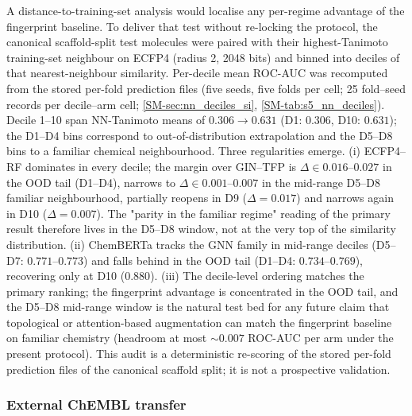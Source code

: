 \documentclass[11pt,a4paper]{article}
\begin{document}
A distance-to-training-set analysis would localise any per-regime advantage of the fingerprint baseline. To deliver that test without re-locking the protocol, the canonical scaffold-split test molecules were paired with their highest-Tanimoto training-set neighbour on ECFP4 (radius \num{2}, \num{2048} bits) and binned into deciles of that nearest-neighbour similarity. Per-decile mean ROC-AUC was recomputed from the stored per-fold prediction files (five seeds, five folds per cell; \num{25} fold--seed records per decile--arm cell; \cref{SM-sec:nn_deciles_si}, \cref{SM-tab:s5_nn_deciles}). Decile \numrange{1}{10} span NN-Tanimoto means of $\num{0.306} \to \num{0.631}$ (D\num{1}: $\num{0.306}$, D\num{10}: $\num{0.631}$); the D\num{1}--D\num{4} bins correspond to out-of-distribution extrapolation and the D\num{5}--D\num{8} bins to a familiar chemical neighbourhood. Three regularities emerge. (i) ECFP4--RF dominates in every decile; the margin over GIN--TFP is $\Delta \in \numrange{0.016}{0.027}$ in the OOD tail (D\num{1}--D\num{4}), narrows to $\Delta \in \numrange{0.001}{0.007}$ in the mid-range D\num{5}--D\num{8} familiar neighbourhood, partially reopens in D\num{9} ($\Delta = \num{+0.017}$) and narrows again in D\num{10} ($\Delta = \num{+0.007}$). The "parity in the familiar regime" reading of the primary result therefore lives in the D\num{5}--D\num{8} window, not at the very top of the similarity distribution. (ii) ChemBERTa tracks the GNN family in mid-range deciles (D\num{5}--D\num{7}: $\num{0.771}$--$\num{0.773}$) and falls behind in the OOD tail (D\num{1}--D\num{4}: $\num{0.734}$--$\num{0.769}$), recovering only at D\num{10} ($\num{0.880}$). (iii) The decile-level ordering matches the primary ranking; the fingerprint advantage is concentrated in the OOD tail, and the D\num{5}--D\num{8} mid-range window is the natural test bed for any future claim that topological or attention-based augmentation can match the fingerprint baseline on familiar chemistry (headroom at most $\sim\num{0.007}$ ROC-AUC per arm under the present protocol). This audit is a deterministic re-scoring of the stored per-fold prediction files of the canonical scaffold split; it is not a prospective validation.

\subsubsection{External ChEMBL transfer}
\end{document}
